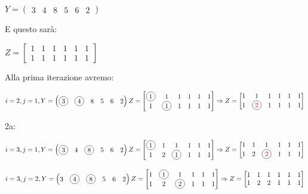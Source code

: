 \begin{example}{}{}
	$Y = \begin{pmatrix}3 & 4 & 8 & 5 & 6 & 2 \end{pmatrix}$

	E questo sarà:
	
	$Z = \begin{bmatrix}
		1 & 1 & 1 & 1 & 1 & 1 \\
		1 & 1 & 1 & 1 & 1 & 1
	\end{bmatrix}$ 

	Alla prima iterazione avremo:

	$i = 2, j = 1, Y = \begin{pmatrix} \circled{3} & \circled{4} & 8 & 5 & 6 & 2 \end{pmatrix} \\
	Z = \begin{bmatrix}
		\circled{1} & 1 & 1 & 1 & 1 & 1 \\
		1 & \circled{1} & 1 & 1 & 1 & 1
	\end{bmatrix} \Rightarrow Z = \begin{bmatrix}
		1 & 1 & 1 & 1 & 1 & 1 \\
		1 & \circled{\textcolor{red}{2}} & 1 & 1 & 1 & 1
	\end{bmatrix}$

	2a: 

	$i = 3, j = 1, Y = \begin{pmatrix} \circled{3} & 4 & \circled{8} & 5 & 6 & 2 \end{pmatrix} \\
	Z = \begin{bmatrix}
		\circled{1} & 1 & 1 & 1 & 1 & 1 \\
		1 & 2 & \circled{1} & 1 & 1 & 1
	\end{bmatrix} \Rightarrow Z = \begin{bmatrix}
		1 & 1 & 1 & 1 & 1 & 1 \\
		1 & 2 & \circled{\textcolor{red}{2}} & 1 & 1 & 1
	\end{bmatrix}$

	$i = 3, j = 2, Y = \begin{pmatrix} 3 & \circled{4} & \circled{8} & 5 & 6 & 2 \end{pmatrix} \\
	Z = \begin{bmatrix}
		1 & \circled{1} & 1 & 1 & 1 & 1 \\
		1 & 2 & \circled{2} & 1 & 1 & 1
	\end{bmatrix} \Rightarrow Z = \begin{bmatrix}
		1 & 1 & 1 & 1 & 1 & 1 \\
		1 & 2 & 2 & 1 & 1 & 1
	\end{bmatrix}$


\end{example}
